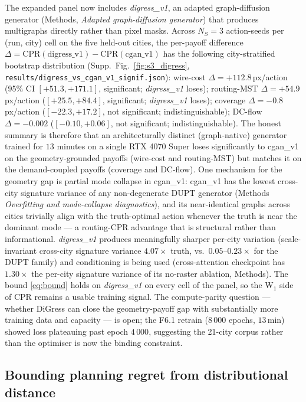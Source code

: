 \documentclass[10pt,a4paper]{article}
\begin{document}
The expanded panel now includes \textit{digress\_v1}, an adapted
graph-diffusion generator (Methods,
\textit{Adapted graph-diffusion generator}) that produces
multigraphs directly rather than pixel masks. Across $N_S = 3$
action-seeds per (run, city) cell on the five held-out cities,
the per-payoff difference $\Delta = \mathrm{CPR}(\text{digress\_v1})
- \mathrm{CPR}(\text{cgan\_v1})$ has the following
city-stratified bootstrap distribution
(Supp.~Fig.~\ref{fig:s3_digress},
\texttt{results/digress\_vs\_cgan\_v1\_signif.json}):
wire-cost $\Delta = +112.8$\,px/action (95\% CI
$[+51.3, +171.1]$, significant; \emph{digress\_v1} loses);
routing-MST $\Delta = +54.9$\,px/action ($[+25.5, +84.4]$,
significant; \emph{digress\_v1} loses); coverage
$\Delta = -0.8$\,px/action ($[-22.3, +17.2]$, not significant;
indistinguishable); DC-flow $\Delta = -0.002$
($[-0.10, +0.06]$, not significant; indistinguishable). The
honest summary is therefore that an architecturally distinct
(graph-native) generator trained for $13$ minutes on a single
RTX 4070 Super loses significantly to cgan\_v1 on the
geometry-grounded payoffs (wire-cost and routing-MST) but
matches it on the demand-coupled payoffs (coverage and
DC-flow). One mechanism for the geometry gap is partial mode
collapse in cgan\_v1: cgan\_v1 has the lowest cross-city
signature variance of any non-degenerate DUPT generator (Methods
\textit{Overfitting and mode-collapse diagnostics}), and its
near-identical graphs across cities trivially align with the
truth-optimal action whenever the truth is near the dominant
mode --- a routing-CPR advantage that is structural rather than
informational. \emph{digress\_v1} produces meaningfully sharper
per-city variation (scale-invariant cross-city signature
variance $4.07\times$ truth, vs.\ $0.05$--$0.23\times$ for the
DUPT family) and conditioning is being used (cross-attention
checkpoint has $1.30\times$ the per-city signature variance of
its no-raster ablation, Methods). The bound
\eqref{eq:bound} holds on \textit{digress\_v1} on every cell of
the panel, so the W$_1$ side of CPR remains a usable training
signal. The compute-parity question --- whether DiGress can
close the geometry-payoff gap with substantially more training
data and capacity --- is open; the F6.1 retrain (8\,000 epochs,
$13$\,min) showed loss plateauing past epoch $4\,000$,
suggesting the 21-city corpus rather than the optimiser is now
the binding constraint.

\subsection{Bounding planning regret from distributional distance}
\end{document}
